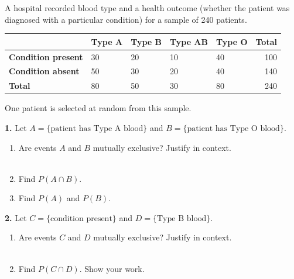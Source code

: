 \documentclass[10pt]{article}
\begin{document}
\namedateperiod

\vspace{0.1in}

\begin{practicebox}
\small
A hospital recorded blood type and a health outcome (whether the patient
was diagnosed with a particular condition) for a sample of 240 patients.

\vspace{6pt}
\renewcommand{\arraystretch}{1.4}
\begin{tabularx}{\linewidth}{@{} l X X X X r @{}}
 & \textbf{Type A} & \textbf{Type B} & \textbf{Type AB} & \textbf{Type O} & \textbf{Total} \\
\hline
\textbf{Condition present}  & 30 & 20 & 10 & 40 & 100 \\
\textbf{Condition absent}   & 50 & 30 & 20 & 40 & 140 \\
\hline
\textbf{Total}              & 80 & 50 & 30 & 80 & 240 \\
\end{tabularx}

\vspace{8pt}
One patient is selected at random from this sample.

\vspace{8pt}
\textbf{1.} Let $A = \{\text{patient has Type A blood}\}$ and
$B = \{\text{patient has Type O blood}\}$.

\begin{enumerate}[label=(\alph*), leftmargin=2em, itemsep=6pt]
  \item Are events $A$ and $B$ mutually exclusive? Justify in context.\\
        \writeline\\[1pt]\writeline
  \item Find $P(A \cap B)$. \blank{4cm}
  \item Find $P(A)$ and $P(B)$. \blank{6cm}
\end{enumerate}

\vspace{8pt}
\textbf{2.} Let $C = \{\text{condition present}\}$ and $D = \{\text{Type B blood}\}$.

\begin{enumerate}[label=(\alph*), leftmargin=2em, itemsep=6pt]
  \item Are events $C$ and $D$ mutually exclusive? Justify in context.\\
        \writeline\\[1pt]\writeline
  \item Find $P(C \cap D)$. Show your work. \blank{5cm}
\end{enumerate}


\end{practicebox}
\end{document}
